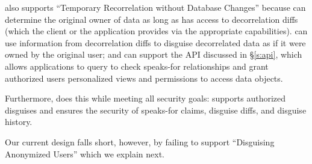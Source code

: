 %
\sys also supports ``Temporary Recorrelation without Database Changes'' because \sys can determine
the original owner of data as long as \sys has access to decorrelation diffs (which the client or
the application provides via the appropriate capabilities).
%
\sys can use information from decorrelation diffs to disguise decorrelated data as if it were owned
by the original user; and
%
\sys can support the API discussed in \S\ref{s:api}, which allows applications to query \sys to
check speaks-for relationships and grant authorized users personalized views and permissions to access
data objects.

Furthermore, \sys does this while meeting all security goals: \sys supports authorized disguises and
ensures the security of speaks-for claims, disguise diffs, and disguise history.

Our current design falls short, however, by failing to support ``Disguising Anonymized
Users'' which we explain next.
\fi
